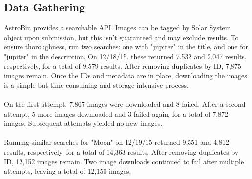 \documentclass[]{article}
\begin{document}
\subsection*{Data Gathering}
AstroBin provides a searchable API. Images can be tagged by Solar System object upon submission, but this isn't guaranteed and may exclude results. To ensure thoroughness, run two searches: one with "jupiter" in the title, and one for "jupiter" in the description. On 12/18/15, these returned 7,532 and 2,047 results, respectively, for a total of 9,579 results. After removing duplicates by ID, 7,875 images remain. Once the IDs and metadata are in place, downloading the images is a simple but time-consuming and storage-intensive process.
\\\\
On the first attempt, 7,867 images were downloaded and 8 failed. After a second attempt, 5 more images downloaded and 3 failed again, for a total of 7,872 images. Subsequent attempts yielded no new images.
\\\\
Running similar searches for "Moon" on 12/19/15 returned 9,551 and 4,812 results, respectively, for a total of 14,363 results. After removing duplicates by ID, 12,152 images remain. Two image downloads continued to fail after multiple attempts, leaving a total of 12,150 images.
\end{document}
